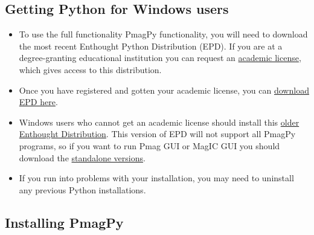 \documentclass[11pt]{book}
\begin{document}
{ \subsection{Getting Python for Windows users}
   \begin{itemize}
   \item To use the full functionality PmagPy functionality, you will need to download the most recent Enthought Python Distribution (EPD).  If you are at a degree-granting educational institution you can request an \href{https://www.enthought.com/products/canopy/academic/}{academic license}, which gives access to this distribution.
   \item Once you have registered and gotten your academic license, you can \href{https://store.enthought.com/repo/epd/installers/epd-7.5-2-win-x86_64.msi}{download EPD here}.
   \item Windows users who cannot get an academic license should install this \href{http://magician.ucsd.edu/Software/PmagPy/archive/epd-7.3-2-win-x86.msi}{older Enthought Distribution}.  This version of EPD will not support all PmagPy programs, so if you want to run Pmag GUI or MagIC GUI you should download the \href{#standalone}{standalone versions}.
   \item If you run into problems with your installation, you may need to uninstall any previous Python installations.
   \end{itemize}
 \subsection{Installing PmagPy}
 \begin{itemize}
   

\end{itemize}}
\end{document}
